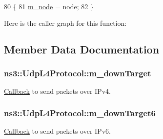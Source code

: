 \begin{DoxyCode}
80 \{
81   \hyperlink{classns3_1_1UdpL4Protocol_a3b659100db66be53351016f3875ba62a}{m\_node} = node;
82 \}
\end{DoxyCode}


Here is the caller graph for this function\+:




\subsection{Member Data Documentation}
\subsubsection[{\texorpdfstring{m\+\_\+down\+Target}{m_downTarget}}]{ ns3\+::\+Udp\+L4\+Protocol\+::m\+\_\+down\+Target\hspace{0.3cm}{\ttfamily [private]}}\hypertarget{classns3_1_1UdpL4Protocol_a82401fff4ce9b7f04ef1aa5cfeebd010}{}\label{classns3_1_1UdpL4Protocol_a82401fff4ce9b7f04ef1aa5cfeebd010}


\hyperlink{classns3_1_1Callback}{Callback} to send packets over I\+Pv4. 

\subsubsection[{\texorpdfstring{m\+\_\+down\+Target6}{m_downTarget6}}]{ ns3\+::\+Udp\+L4\+Protocol\+::m\+\_\+down\+Target6\hspace{0.3cm}{\ttfamily [private]}}\hypertarget{classns3_1_1UdpL4Protocol_a82cec3d00eafff718533aa5191624e05}{}\label{classns3_1_1UdpL4Protocol_a82cec3d00eafff718533aa5191624e05}


\hyperlink{classns3_1_1Callback}{Callback} to send packets over I\+Pv6. 

